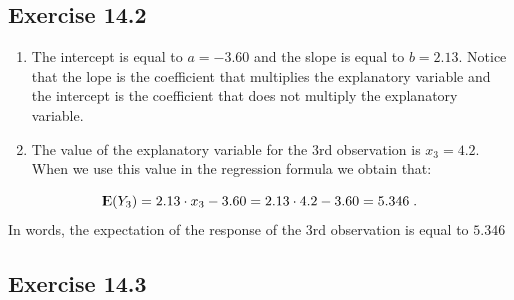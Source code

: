 \documentclass[]{krantz}
\newcommand{\Expec}{{\rm I\kern-.3em E}}
\theoremstyle{definition}
\theoremstyle{definition}
\theoremstyle{definition}
\theoremstyle{remark}
\begin{document}
\hypertarget{exercise-14.2}{%
\subsection*{Exercise 14.2}\label{exercise-14.2}}


\begin{enumerate}
\def\labelenumi{\arabic{enumi}.}
\item
  The intercept is equal to
  \(a = -3.60\) and the slope is equal to \(b = 2.13\). Notice that the lope
  is the coefficient that multiplies the explanatory variable and the
  intercept is the coefficient that does not multiply the explanatory
  variable.
\item
  The value of the explanatory
  variable for the 3rd observation is \(x_3 = 4.2\). When we use this value
  in the regression formula we obtain that:
\end{enumerate}

\[\Expec(Y_3) = 2.13 \cdot x_3 - 3.60 = 2.13 \cdot 4.2 - 3.60 = 5.346\;.\]
In words, the expectation of the response of the 3rd observation is
equal to \(5.346\)

\hypertarget{exercise-14.3}{%
\subsection*{Exercise 14.3}\label{exercise-14.3}}
\end{document}
